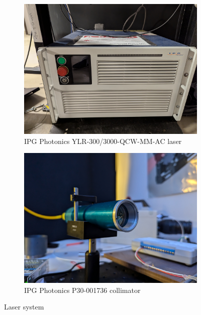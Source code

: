             \begin{figure}[!ht]
                \centering
                \begin{subfigure}[t]{0.45\textwidth}
                    \centering
                    \includegraphics[width=\textwidth]{assets/3 design/Laser box.jpg}
                    \caption{IPG Photonics YLR-300/3000-QCW-MM-AC laser}
                \end{subfigure}
                \hfill
                \begin{subfigure}[t]{0.45\textwidth}
                    \centering
                    \includegraphics[width=\textwidth]{assets/3 design/Laser aperture.jpg}
                    \caption{IPG Photonics P30-001736 collimator}
                \end{subfigure}
                \caption{Laser system}
            \end{figure}

